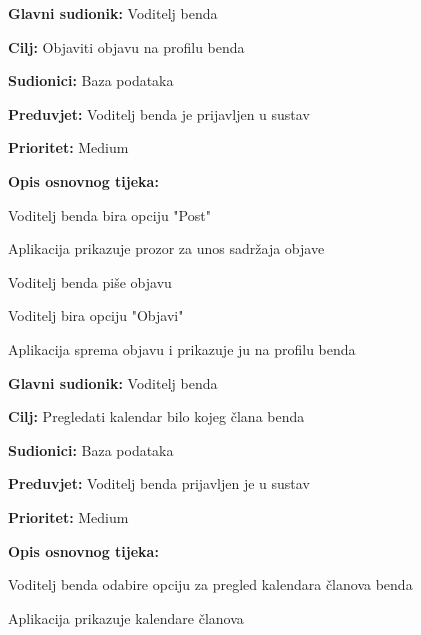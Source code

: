 \noindent {}
	\begin{packed_item}
		
		\item \textbf{Glavni sudionik: } Voditelj benda
		\item \textbf{Cilj:} Objaviti objavu na profilu benda
		\item \textbf{Sudionici:} Baza podataka
		\item \textbf{Preduvjet:} Voditelj benda je prijavljen u sustav
		\item \textbf{Prioritet:} Medium
		\item \textbf{Opis osnovnog tijeka:} 
		
		\item[] \begin{packed_enum}
			
			\item Voditelj benda bira opciju "Post"
			\item Aplikacija prikazuje prozor za unos sadržaja objave
			\item Voditelj benda piše objavu
			\item Voditelj bira opciju "Objavi"
			\item Aplikacija sprema objavu i prikazuje ju na profilu benda
		\end{packed_enum}  
	\end{packed_item}


\noindent {}
	\begin{packed_item}
		
		\item \textbf{Glavni sudionik:} Voditelj benda 
		\item \textbf{Cilj:} Pregledati kalendar bilo kojeg člana benda
		\item \textbf{Sudionici:} Baza podataka
		\item \textbf{Preduvjet:} Voditelj benda prijavljen je u sustav
		\item \textbf{Prioritet:} Medium
		\item \textbf{Opis osnovnog tijeka:} 
		
		\item[] \begin{packed_enum}
			
			\item Voditelj benda odabire opciju za pregled kalendara članova benda
			\item Aplikacija prikazuje kalendare članova
		\end{packed_enum}  
	\end{packed_item}

